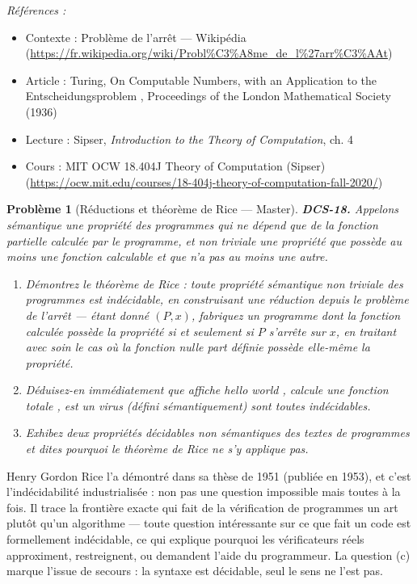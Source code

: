 \documentclass[11pt]{article}
\newtheorem{problem}{Problème}
\newenvironment{refs}{\par\small\noindent\emph{Références :}\begin{itemize}\setlength\itemsep{0pt}}{\end{itemize}\normalsize}
\begin{document}
\begin{refs}
\item Contexte : Problème de l'arrêt --- Wikipédia (\url{https://fr.wikipedia.org/wiki/Probl%C3%A8me_de_l%27arr%C3%AAt})
\item Article : Turing, \og{} On Computable Numbers, with an Application to the Entscheidungsproblem \fg{}, Proceedings of the London Mathematical Society (1936)
\item Lecture : Sipser, \textit{Introduction to the Theory of Computation}, ch. 4
\item Cours : MIT OCW 18.404J Theory of Computation (Sipser) (\url{https://ocw.mit.edu/courses/18-404j-theory-of-computation-fall-2020/})
\end{refs}

\bigskip

\begin{problem}[{Réductions et théorème de Rice --- Master}]
\textbf{DCS-18.} Appelons \textit{sémantique} une propriété des programmes qui ne dépend que de la fonction partielle calculée par le programme, et \textit{non triviale} une propriété que possède au moins une fonction calculable et que n'a pas au moins une autre.
\begin{enumerate}
\item[(a)] Démontrez le théorème de Rice : toute propriété sémantique non triviale des programmes est indécidable, en construisant une réduction depuis le problème de l'arrêt --- étant donné $(P, x)$, fabriquez un programme dont la fonction calculée possède la propriété si et seulement si $P$ s'arrête sur $x$, en traitant avec soin le cas où la fonction nulle part définie possède elle-même la propriété.
\item[(b)] Déduisez-en immédiatement que \og{} affiche hello world \fg{}, \og{} calcule une fonction totale \fg{}, \og{} est un virus \fg{} (défini sémantiquement) sont toutes indécidables.
\item[(c)] Exhibez deux propriétés décidables \textit{non sémantiques} des textes de programmes et dites pourquoi le théorème de Rice ne s'y applique pas.
\end{enumerate}

\end{problem}

\noindent Henry Gordon Rice l'a démontré dans sa thèse de 1951 (publiée en 1953), et c'est l'indécidabilité industrialisée : non pas une question impossible mais toutes à la fois. Il trace la frontière exacte qui fait de la vérification de programmes un art plutôt qu'un algorithme --- toute question intéressante sur ce que fait un code est formellement indécidable, ce qui explique pourquoi les vérificateurs réels approximent, restreignent, ou demandent l'aide du programmeur. La question (c) marque l'issue de secours : la syntaxe est décidable, seul le sens ne l'est pas.
\end{document}
